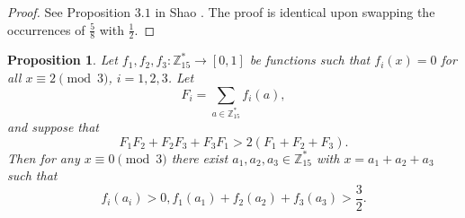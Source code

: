 \documentclass[a4paper,11pt,twoside]{amsart}
\newtheorem{proposition}[theorem]{Proposition}
\theoremstyle{definition}
\numberwithin{equation}{section}
\newcommand\Z{\mathbb{Z}}
\begin{document}
\begin{proof}See Proposition $3.1$ in Shao \cite{Shao}. The proof is identical upon swapping the occurrences of $\frac{5}{8}$ with $\frac{1}{2}$.
\end{proof}


\begin{proposition}\label{local-prop2}
Let $f_1,f_2,f_3 : \Z_{15}^* \rightarrow [0,1]$ be functions such that $f_i(x) = 0$ for all $x \equiv 2 \pmod{3}$, $i = 1,2,3$. Let $$F_i = \sum_{a \in \Z_{15}^*}f_i(a),$$ and suppose that \begin{equation} \label{F1F2F3}
    F_1F_2 + F_2F_3 + F_3F_1 > 2(F_1 + F_2 + F_3).
\end{equation} Then for any $x \equiv 0 \pmod{3}$ there exist $a_1,a_2,a_3 \in \Z_{15}^*$ with $x = a_1 + a_2 + a_3$ such that $$f_i(a_i) > 0, f_1(a_1) + f_2(a_2) + f_3(a_3) > \frac{3}{2}.$$
\end{proposition} 
\end{document}
